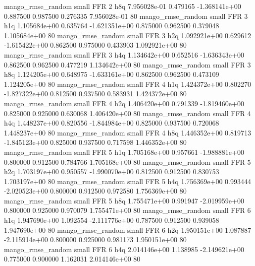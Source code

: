 mango_rmse_random      small      FFR                 2                  h8q 7.956028e-01      0.479165 -1.368141e+00 0.887500 0.987500       0.276335 7.956028e-01 80
mango_rmse_random      small      FFR                 3                  h1q 1.105684e+00      0.635764 -1.621351e+00 0.875000 0.962500       0.379048 1.105684e+00 80
mango_rmse_random      small      FFR                 3                  h2q 1.092921e+00      0.629612 -1.615422e+00 0.862500 0.975000       0.433903 1.092921e+00 80
mango_rmse_random      small      FFR                 3                  h4q 1.134642e+00      0.652516 -1.636343e+00 0.862500 0.962500       0.477219 1.134642e+00 80
mango_rmse_random      small      FFR                 3                  h8q 1.124205e+00      0.648975 -1.633161e+00 0.862500 0.962500       0.473109 1.124205e+00 80
mango_rmse_random      small      FFR                 4                  h1q 1.424372e+00      0.802270 -1.827322e+00 0.812500 0.937500       0.583931 1.424372e+00 80
mango_rmse_random      small      FFR                 4                  h2q 1.406420e+00      0.791339 -1.819460e+00 0.825000 0.925000       0.630068 1.406420e+00 80
mango_rmse_random      small      FFR                 4                  h4q 1.448237e+00      0.820556 -1.844984e+00 0.825000 0.937500       0.720068 1.448237e+00 80
mango_rmse_random      small      FFR                 4                  h8q 1.446352e+00      0.819713 -1.845123e+00 0.825000 0.937500       0.717598 1.446352e+00 80
mango_rmse_random      small      FFR                 5                  h1q 1.705168e+00      0.957661 -1.988881e+00 0.800000 0.912500       0.784766 1.705168e+00 80
mango_rmse_random      small      FFR                 5                  h2q 1.703197e+00      0.950557 -1.990070e+00 0.812500 0.912500       0.830753 1.703197e+00 80
mango_rmse_random      small      FFR                 5                  h4q 1.756369e+00      0.993444 -2.020523e+00 0.800000 0.912500       0.972580 1.756369e+00 80
mango_rmse_random      small      FFR                 5                  h8q 1.755471e+00      0.991947 -2.019959e+00 0.800000 0.925000       0.970079 1.755471e+00 80
mango_rmse_random      small      FFR                 6                  h1q 1.947690e+00      1.092554 -2.111776e+00 0.787500 0.912500       0.939058 1.947690e+00 80
mango_rmse_random      small      FFR                 6                  h2q 1.950151e+00      1.087887 -2.115914e+00 0.800000 0.925000       0.981173 1.950151e+00 80
mango_rmse_random      small      FFR                 6                  h4q 2.014146e+00      1.138985 -2.149621e+00 0.775000 0.900000       1.162031 2.014146e+00 80
